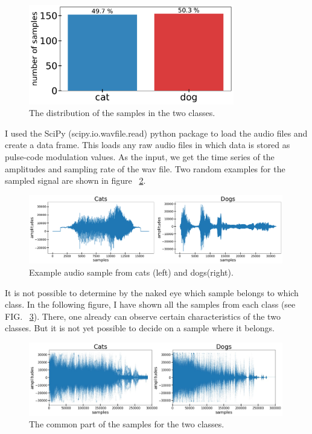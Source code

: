 \documentclass[12pt a4paper]{article}
\numberwithin{equation}{section}
\begin{document}
\begin{figure}[H]
\centering
\includegraphics[width=0.8\textwidth]{fig/ration.pdf}
\caption{The distribution of the samples in the two classes.}
\label{fig1}
\end{figure}

I used the SciPy (scipy.io.wavfile.read) python package to load the audio files and create a data frame. This loads any raw audio files in which data is stored as pulse-code modulation values. As the input, we get the time series of the amplitudes and sampling rate of the wav file. Two random examples for the sampled signal are shown in figure ~\ref{fig2}.

\begin{figure}[H]
\centering
\includegraphics[width=0.99\textwidth]{fig/example.pdf}
\caption{Example audio sample from cats (left) and dogs(right).}
\label{fig2}
\end{figure}
It is not possible to determine by the naked eye which sample belongs to which class. In the following figure, I have shown all the samples from each class (see FIG. ~\ref{fig3}). There, one already can observe certain characteristics of the two classes. But it is not yet possible to decide on a sample where it belongs.

\begin{figure}[H]
\centering
\includegraphics[width=0.99\textwidth]{fig/all.jpg}
\caption{The common part of the samples for the two classes.}
\label{fig3}
\end{figure}
\end{document}
